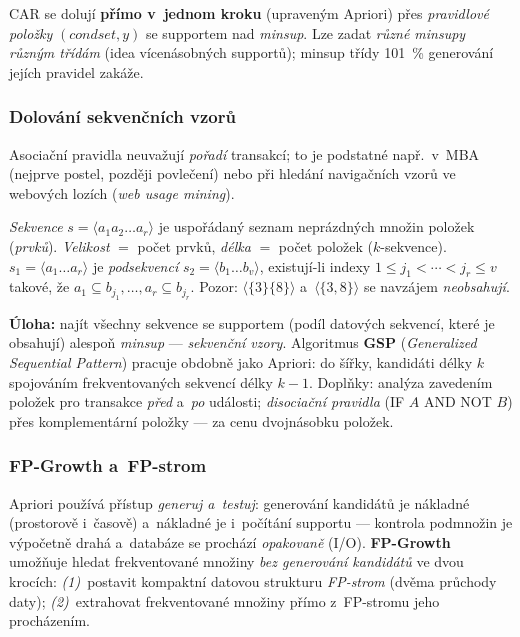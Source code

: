 \documentclass[11pt,a4paper]{article}
\theoremstyle{definition}
\begin{document}
CAR se dolují \textbf{přímo v~jednom kroku} (upraveným Apriori) přes \emph{pravidlové
položky} $(\mathit{condset},y)$ se supportem nad \emph{minsup}. Lze zadat \emph{různé
minsupy různým třídám} (idea vícenásobných supportů); minsup třídy 101~\% generování jejích
pravidel zakáže.

\subsubsection{Dolování sekvenčních vzorů}

Asociační pravidla neuvažují \emph{pořadí} transakcí; to je podstatné např.\ v~MBA (nejprve
postel, později povlečení) nebo při hledání navigačních vzorů ve webových lozích
(\emph{web usage mining}).

\begin{defbox}
\emph{Sekvence} $s=\langle a_1a_2\dots a_r\rangle$ je uspořádaný seznam neprázdných množin
položek (\emph{prvků}). \emph{Velikost} $=$ počet prvků, \emph{délka} $=$ počet položek
($k$-sekvence). $s_1=\langle a_1\dots a_r\rangle$ je \emph{podsekvencí}
$s_2=\langle b_1\dots b_v\rangle$, existují-li indexy $1\le j_1<\cdots<j_r\le v$ takové, že
$a_1\subseteq b_{j_1},\dots,a_r\subseteq b_{j_r}$. Pozor: $\langle\{3\}\{8\}\rangle$
a~$\langle\{3,8\}\rangle$ se navzájem \emph{neobsahují}.
\end{defbox}

\textbf{Úloha:} najít všechny sekvence se supportem (podíl datových sekvencí, které je
obsahují) alespoň \emph{minsup} --- \emph{sekvenční vzory}. Algoritmus \textbf{GSP}
(\emph{Generalized Sequential Pattern}) pracuje obdobně jako Apriori: do šířky, kandidáti
délky $k$ spojováním frekventovaných sekvencí délky $k-1$. Doplňky: analýza
 zavedením položek pro transakce \emph{před} a~\emph{po} události;
\emph{disociační pravidla} (IF $A$ AND NOT $B$) přes komplementární položky --- za cenu
dvojnásobku položek.

\subsubsection{FP-Growth a~FP-strom}

Apriori používá přístup \emph{generuj a~testuj}: generování kandidátů je nákladné (prostorově
i~časově) a~nákladné je i~počítání supportu --- kontrola podmnožin je výpočetně drahá
a~databáze se prochází \emph{opakovaně} (I/O). \textbf{FP-Growth} umožňuje hledat
frekventované množiny \emph{bez generování kandidátů} ve dvou krocích: \emph{(1)}~postavit
kompaktní datovou strukturu \emph{FP-strom} (dvěma průchody daty); \emph{(2)}~extrahovat
frekventované množiny přímo z~FP-stromu jeho procházením.
\end{document}
